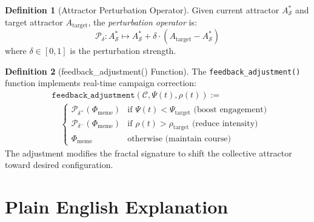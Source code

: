 \documentclass[11pt,twoside]{book}
\theoremstyle{definition}
\newtheorem{definition}{Definition}[chapter]
\theoremstyle{plain}
\theoremstyle{remark}
\newcommand{\Frac}{\Phi}
\begin{document}
\begin{definition}[Attractor Perturbation Operator]
\label{def:attractor-perturbation}
Given current attractor $A_{\mathcal{S}}^*$ and target attractor $A_{\mathrm{target}}$, the \emph{perturbation operator} is:
\[
    \mathcal{P}_{\delta} : A_{\mathcal{S}}^* \mapsto A_{\mathcal{S}}^* + \delta \cdot (A_{\mathrm{target}} - A_{\mathcal{S}}^*)
\]
where $\delta \in [0, 1]$ is the perturbation strength.
\end{definition}

\begin{definition}[feedback\_adjustment() Function]
\label{def:feedback-adjustment}
The \texttt{feedback\_adjustment()} function implements real-time campaign correction:
\[
\boxed{
\begin{aligned}
    &\mathtt{feedback\_adjustment}(\mathcal{C}, \Psi(t), \rho(t)) := \\
    &\quad \begin{cases}
        \mathcal{P}_{\delta^+}(\Frac_{\mathrm{meme}}) & \text{if } \Psi(t) < \Psi_{\mathrm{target}}
        \text{ (boost engagement)} \\
        \mathcal{P}_{\delta^-}(\Frac_{\mathrm{meme}}) & \text{if } \rho(t) > \rho_{\mathrm{target}}
        \text{ (reduce intensity)} \\
        \Frac_{\mathrm{meme}} & \text{otherwise (maintain course)}
    \end{cases}
\end{aligned}
}
\]
The adjustment modifies the fractal signature to shift the collective attractor toward desired configuration.
\end{definition}

\chapter{Plain English Explanation}
\end{document}

